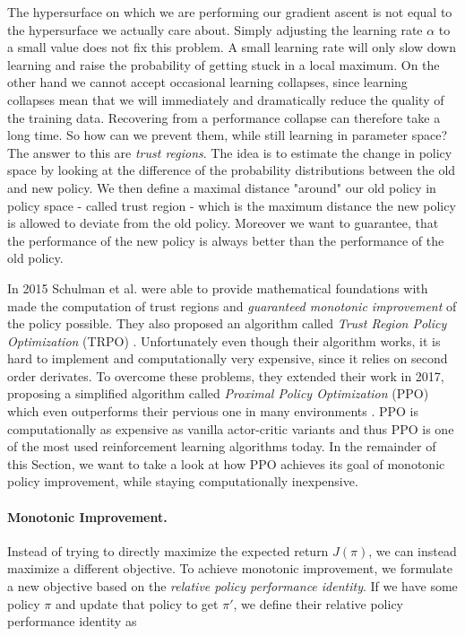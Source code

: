 The hypersurface on which we are performing our gradient ascent is not equal to the hypersurface we actually care about. Simply adjusting the learning rate $\alpha$ to a small value does not fix this problem. A small learning rate will only slow down learning and raise the probability of getting stuck in a local maximum. On the other hand we cannot accept occasional learning collapses, since learning collapses mean that we will immediately and dramatically reduce the quality of the training data. Recovering from a performance collapse can therefore take a long time. So how can we prevent them, while still learning in parameter space? The answer to this are \textit{trust regions}. The idea is to estimate the change in policy space by looking at the difference of the probability distributions between the old and new policy. We then define a maximal distance "around" our old policy in policy space - called trust region - which is the maximum distance the new policy is allowed to deviate from the old policy. Moreover we want to guarantee, that the performance of the new policy is always better than the performance of the old policy.

In 2015 Schulman et al. were able to provide mathematical foundations with made the computation of trust regions and \textit{guaranteed monotonic improvement} of the policy possible. They also proposed an algorithm called \textit{Trust Region Policy Optimization} (TRPO) \cite{schulman2015trust}. Unfortunately even though their algorithm works, it is hard to implement and computationally very expensive, since it relies on second order derivates. To overcome these problems, they extended their work in 2017, proposing a simplified algorithm called \textit{Proximal Policy Optimization} (PPO) which even outperforms their pervious one in many environments \cite{schulman2017proximal}. PPO is computationally as expensive as vanilla actor-critic variants and thus PPO is one of the most used reinforcement learning algorithms today. In the remainder of this Section, we want to take a look at how PPO achieves its goal of monotonic policy improvement, while staying computationally inexpensive.

\paragraph{Monotonic Improvement.}
Instead of trying to directly maximize the expected return $J(\pi)$, we can instead maximize a different objective. To achieve monotonic improvement, we formulate a new objective based on the \textit{relative policy performance identity}. If we have some policy $\pi$ and update that policy to get $\pi'$, we define their relative policy performance identity as


